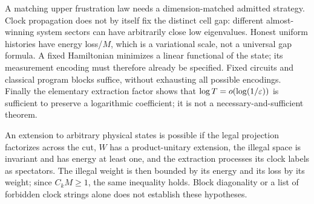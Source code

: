 A matching upper frustration law needs a dimension-matched admitted
strategy. Clock propagation does not by itself fix the distinct cell
gap: different almost-winning system sectors can have arbitrarily
close low eigenvalues. Honest uniform histories have energy loss/$M$,
which is a variational scale, not a universal gap formula. A fixed
Hamiltonian minimizes a linear functional of the state; its
measurement encoding must therefore already be specified. Fixed
circuits and classical program blocks suffice, without exhausting
all possible encodings. Finally the elementary extraction factor
shows that $\log T=o(\log(1/\varepsilon))$ is sufficient to preserve a
logarithmic coefficient; it is not a necessary-and-sufficient theorem.

An extension to arbitrary physical states is possible if the legal
projection factorizes across the cut, $W$ has a product-unitary
extension, the illegal space is invariant and has energy at least one,
and the extraction processes its clock labels as spectators. The illegal
weight is then bounded by its energy and its loss by its weight; since
$C_kM\geq1$, the same inequality holds. Block diagonality or a list
of forbidden clock strings alone does not establish these hypotheses.
